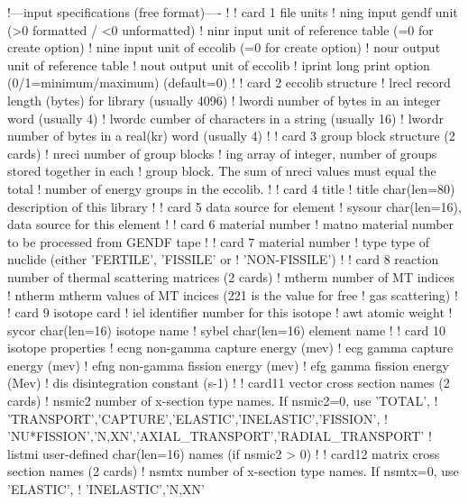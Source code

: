 \small
\begin{ccode}
  !---input specifications (free format)----
  !
  ! card 1 file units
  !   ning      input gendf unit (>0 formatted / <0 unformatted)
  !   ninr      input unit of reference table (=0 for create option)
  !   nine      input unit of eccolib (=0 for create option)
  !   nour      output unit of reference table
  !   nout      output unit of eccolib
  !   iprint    long print option (0/1=minimum/maximum) (default=0)
  !
  ! card 2 eccolib structure
  !   lrecl     record length (bytes) for library (usually 4096)
  !   lwordi    number of bytes in an integer word (usually 4)
  !   lwordc    cumber of characters in a string (usually 16)
  !   lwordr    number of bytes in a real(kr) word (usually 4)
  !
  ! card 3 group block structure (2 cards)
  !   nreci     number of group blocks
  !   ing       array of integer, number of groups stored together in each
  !             group block. The sum of nreci values must equal the total
  !             number of energy groups in the eccolib.
  !
  ! card 4 title
  !   title     char(len=80) description of this library
  !
  ! card 5 data source for element
  !   sysour    char(len=16), data source for this element
  !
  ! card 6 material number
  !   matno     material number to be processed from GENDF tape
  !
  ! card 7 material number
  !   type      type of nuclide (either 'FERTILE', 'FISSILE' or
  !             'NON-FISSILE')
  !
  ! card 8 reaction number of thermal scattering matrices (2 cards)
  !   mtherm    number of MT indices
  !   ntherm    mtherm values of MT incices (221 is the value for free
  !             gas scattering)
  !
  ! card 9 isotope card
  !   iel       identifier number for this isotope
  !   awt       atomic weight
  !   sycor     char(len=16) isotope name
  !   sybel     char(len=16) element name
  !
  ! card 10 isotope properties
  !   ecng      non-gamma capture energy (mev)
  !   ecg       gamma capture energy (mev)
  !   efng      non-gamma fission energy (mev)
  !   efg       gamma fission energy (Mev)
  !   dis       disintegration constant (s-1)
  !
  ! card11 vector cross section names (2 cards)
  !   nsmic2    number of x-section type names. If nsmic2=0, use 'TOTAL',
  !             'TRANSPORT','CAPTURE','ELASTIC','INELASTIC','FISSION',
  !             'NU*FISSION','N,XN','AXIAL_TRANSPORT','RADIAL_TRANSPORT'
  !   listmi    user-defined char(len=16) names (if nsmic2 > 0)
  !
  ! card12 matrix cross section names (2 cards)
  !   nsmtx     number of x-section type names. If nsmtx=0, use 'ELASTIC',
  !             'INELASTIC','N,XN'

\end{ccode}
